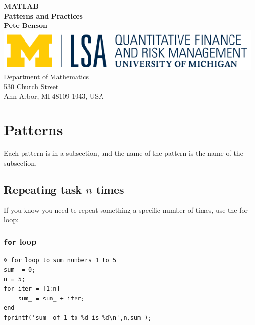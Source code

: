 \documentclass{report}
\newcommand{\code}[1]{\texttt{#1}}
\begin{document}
\begin{titlepage}
\begin{center}
 {\huge\bfseries MATLAB\\ Patterns and Practices\\}
 \vspace{1.5cm}
 {\bfseries Pete Benson}\\[5pt]
 \vspace{10cm}
\includegraphics{QFRM_rgb}\\[5pt]
{Department of Mathematics}\\[5pt]
{530 Church Street}\\[5pt]
{Ann Arbor, MI 48109-1043,
 USA}\\
 \vfill

\end{center}
\end{titlepage}

\chapter{Patterns}

Each pattern is in a subsection, and the name of the pattern is the name of the subsection.

\section{Repeating task $n$ times}
If you know you need to repeat something a specific number of times, use the for loop:

\subsection{\code{for} loop}
\begin{lstlisting}
% for loop to sum numbers 1 to 5
sum_ = 0;
n = 5;
for iter = [1:n]
    sum_ = sum_ + iter;
end
fprintf('sum_ of 1 to %d is %d\n',n,sum_);
\end{lstlisting}
\pagebreak
\end{document}
